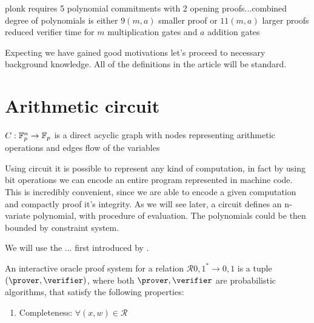 plonk requires 5 polynomial commitments with 2 opening proofs...combined degree of polynomials is either $9(m, a)$ smaller proof or $11(m, a)$ larger proofs reduced verifier time for $m$ multiplication gates and $a$ addition gates

Expecting we have gained good motivations let's proceed to necessary background knowledge. All of the definitions in the article will be standard.


\section{Arithmetic circuit}
\begin{definition}
    $C: \mathbb{F}_p^n \rightarrow \mathbb{F}_p$ is a direct acyclic graph with nodes representing arithmetic operations and edges flow of the variables 
\end{definition}

Using circuit it is possible to represent any kind of computation, in fact by using bit operations we can encode an entire program represented in machine code. This is incredibly convenient, since we are able to encode a given computation and compactly proof it's integrity. As we will see later, a circuit defines an n-variate polynomial, with procedure of evaluation. The polynomials could be then bounded by constraint system.


We will use the ... first introduced by \cite{IOP}. 

\begin{definition}
    An interactive oracle proof system for a relation $\mathcal{R} {0, 1}^* \rightarrow {0, 1}$ is a tuple $(\prover, \verifier)$, where both $\prover, \verifier$ are probabilistic algorithms, that satisfy the following properties:
    \begin{enumerate}
        \item Completeness: $\forall (x, w) \in \mathcal{R}$
    \end{enumerate}
\end{definition}


